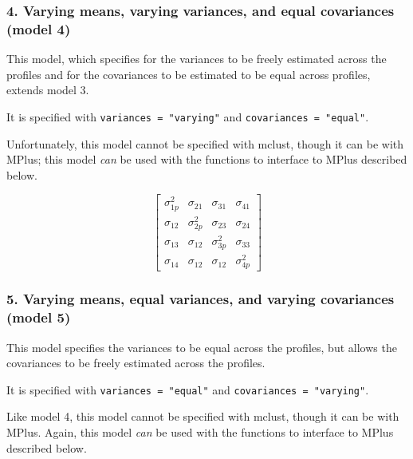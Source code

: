 \documentclass[english,man]{apa6}
\begin{document}
\hypertarget{varying-means-varying-variances-and-equal-covariances-model-4}{%
\subsubsection{4. Varying means, varying variances, and equal covariances (model 4)}\label{varying-means-varying-variances-and-equal-covariances-model-4}}

This model, which specifies for the variances to be freely estimated across the profiles and for the covariances to be estimated to be equal across profiles, extends model 3.

It is specified with \texttt{variances\ =\ "varying"} and \texttt{covariances\ =\ "equal"}.

Unfortunately, this model cannot be specified with mclust, though it can be with MPlus; this model \emph{can} be used with the functions to interface to MPlus described below.

\[
\left[ \begin{matrix} { \sigma  }_{ 1p }^{ 2 } & { \sigma  }_{ 21 } & { \sigma  }_{ 31 } & { \sigma  }_{ 41 } \\ { \sigma  }_{ 12 } & { \sigma  }_{ 2p }^{ 2 } & { \sigma  }_{ 23 } & { \sigma  }_{ 24 } \\ { \sigma  }_{ 13 } & { \sigma  }_{ 12 } & { \sigma  }_{ 3p }^{ 2 } & { \sigma  }_{ 33 } \\ { \sigma  }_{ 14 } & { \sigma  }_{ 12 } & { \sigma  }_{ 12 } & { \sigma  }_{ 4p }^{ 2 } \end{matrix} \right] 
\]

\hypertarget{varying-means-equal-variances-and-varying-covariances-model-5}{%
\subsubsection{5. Varying means, equal variances, and varying covariances (model 5)}\label{varying-means-equal-variances-and-varying-covariances-model-5}}

This model specifies the variances to be equal across the profiles, but allows the covariances to be freely estimated across the profiles.

It is specified with \texttt{variances\ =\ "equal"} and \texttt{covariances\ =\ "varying"}.

Like model 4, this model cannot be specified with mclust, though it can be with MPlus. Again, this model \emph{can} be used with the functions to interface to MPlus described below.
\end{document}
